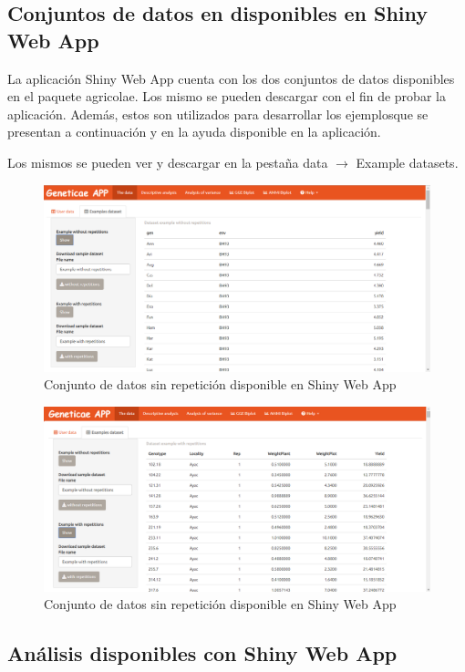 \subsection{Conjuntos de datos en disponibles en Shiny Web App}

La aplicación Shiny Web App cuenta con los dos conjuntos de datos disponibles en el paquete agricolae. Los mismo se pueden descargar con el fin de probar la aplicación. Además, estos son utilizados para desarrollar los ejemplosque se presentan a continuación y en la ayuda disponible en la aplicación.

Los mismos se pueden ver y descargar en la pestaña data $\rightarrow$ Example datasets. 

\begin{figure}[h!]
	\begin{center}
		\includegraphics[width=17cm]{./Graficos/Exampledatasets_withoutrep.png}
	\end{center}
	\caption{Conjunto de datos sin repetición disponible en Shiny Web App}
\end{figure}


\begin{figure}[h!]
	\begin{center}
		\includegraphics[width=17cm]{./Graficos/Exampledatasets_withrep.png}
	\end{center}
	\caption{Conjunto de datos sin repetición disponible en Shiny Web App}
\end{figure}

\subsection{Análisis disponibles con Shiny Web App}


